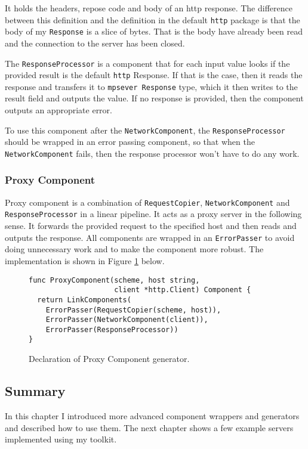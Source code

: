 It holds the headers, repose code and body of an http response. 
The difference between
this definition and the definition in the default \texttt{http} package is that
the body of my \texttt{Response} is a slice of bytes. 
That is the body have already been
read and the connection to the server has been closed.

The \texttt{ResponseProcessor} is a component that for each input value
looks if the provided result is the default \texttt{http} Response. 
If that is the case,
then it reads the response and transfers it to \texttt{mpsever Response} 
type, which it
then writes to the result field and outputs the value. If no response
is provided, then the component outputs an appropriate error.

To use this component after the \texttt{NetworkComponent}, 
the \texttt{ResponseProcessor}
should be wrapped in an error passing component, so that when the\\
\texttt{NetworkComponent} fails, then the response processor won't have to do
any work.

\subsubsection{Proxy Component}
Proxy component is a combination of \texttt{RequestCopier}, 
\texttt{NetworkComponent} 
and \texttt{ResponseProcessor} in a linear pipeline. It acts as a proxy server
in the following sense. It forwards the provided request to the specified
host and then reads and outputs the response. 
All components are wrapped
in an \texttt{ErrorPasser} to avoid doing unnecessary work and to make the component
more robust. The implementation is shown in Figure \ref{fig:ProxyComp} below.

\begin{figure}[h]
\centering
\begin{lstlisting}
func ProxyComponent(scheme, host string, 
                    client *http.Client) Component {
  return LinkComponents(
    ErrorPasser(RequestCopier(scheme, host)),
    ErrorPasser(NetworkComponent(client)),
    ErrorPasser(ResponseProcessor))
}
\end{lstlisting}
\caption[scale=1.0]{Declaration of Proxy Component generator.}
\label{fig:ProxyComp}
\end{figure}
\subsection{Summary}
In this chapter I introduced more advanced component wrappers and generators
and described how to use them. The next chapter shows a few example
servers implemented using my toolkit.

